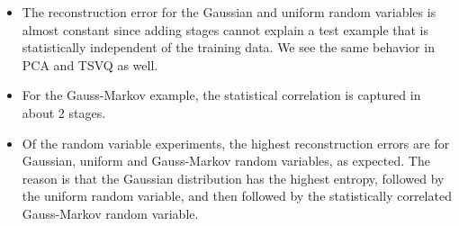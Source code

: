 \begin{itemize}
\item The reconstruction error for the Gaussian and uniform random variables is almost constant since adding stages cannot explain a test example that is statistically independent of the training data.  We see the same behavior in PCA and TSVQ as well.
\item For the Gauss-Markov example, the statistical correlation is captured in about 2 stages.
\item Of the random variable experiments, the highest reconstruction errors are for Gaussian, uniform and Gauss-Markov random variables, as expected.  The reason is that the Gaussian distribution has the highest entropy, followed by the uniform random variable, and then followed by the statistically correlated Gauss-Markov random variable.
\end{itemize}

